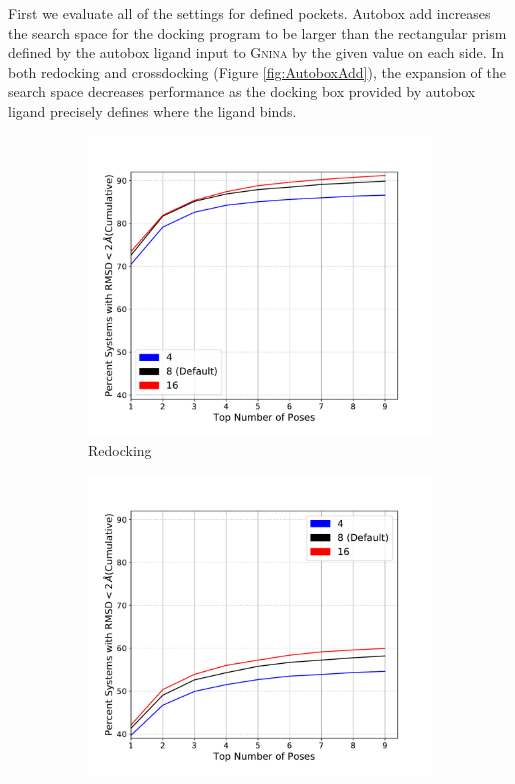 \documentclass[journal=jcisd8,manuscript=article]{achemso}
\begin{document}
First we evaluate all of the settings for defined pockets. Autobox add increases the search space for the docking program to be larger than the rectangular prism defined by the autobox ligand input to \textsc{Gnina} by the given value on each side. In both redocking and crossdocking (Figure \ref{fig:AutoboxAdd}), the expansion of the search space decreases performance as the docking box provided by autobox ligand precisely defines where the ligand binds.

\begin{figure}    
        \begin{subfigure}[b]{0.48\textwidth}    
		\centering
		\includegraphics[width=\textwidth]{figures/redocking/sweep_exhaustiveness_line.pdf}
		\caption{Redocking}
		\label{fig:exhaustiveness rd}
        \end{subfigure}    
        \begin{subfigure}[b]{0.48\textwidth}    
		\centering
		\includegraphics[width=\textwidth]{figures/crossdocking/sweep_exhaustiveness_line.pdf}

\end{subfigure}
\end{figure}
\end{document}

